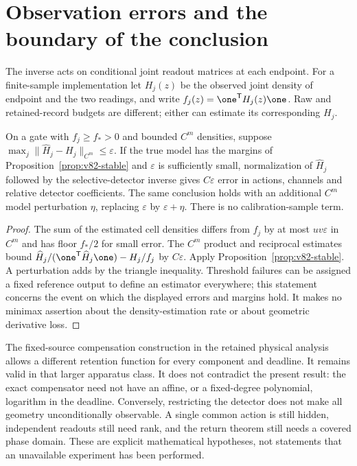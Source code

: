\section{Observation errors and the boundary of the conclusion}
\label{sec:v82-scope}

The inverse acts on conditional joint readout matrices at each endpoint.
For a finite-sample implementation let $H_j(z)$ be the observed joint
density of endpoint and the two readings, and write
$f_j(z)=\one^{\mathsf T}H_j(z)\one$. Raw and retained-record budgets
are different; either can estimate its corresponding $H_j$.

\begin{corollary}
\label{cor:v82-error}
On a gate with $f_j\ge f_*>0$ and bounded $C^m$ densities, suppose
$\max_j\|\widehat H_j-H_j\|_{C^m}\le\varepsilon$.
If the true model has the margins of Proposition~\ref{prop:v82-stable}
and $\varepsilon$ is sufficiently small, normalization of
$\widehat H_j$ followed by the selective-detector inverse gives
$C\varepsilon$ error in actions, channels and relative detector
coefficients. The same conclusion holds with an additional
$C^m$ model perturbation $\eta$, replacing $\varepsilon$ by
$\varepsilon+\eta$. There is no calibration-sample term.
\end{corollary}
\begin{proof}
The sum of the estimated cell densities differs from $f_j$ by at most
$uv\varepsilon$ in $C^m$ and has floor $f_*/2$ for small error.
The $C^m$ product and reciprocal estimates bound
$\widehat H_j/(\one^{\mathsf T}\widehat H_j\one)-H_j/f_j$
by $C\varepsilon$. Apply Proposition~\ref{prop:v82-stable}.
A perturbation adds by the triangle inequality. Threshold failures can
be assigned a fixed reference output to define an estimator everywhere;
this statement concerns the event on which the displayed errors and
margins hold. It makes no minimax assertion about the density-estimation
rate or about geometric derivative loss.
\end{proof}

The fixed-source compensation construction in the retained physical
analysis allows a different retention function for every component and
deadline. It remains valid in that larger apparatus class. It does not
contradict the present result: the exact compensator need not have an
affine, or a fixed-degree polynomial, logarithm in the deadline.
Conversely, restricting the detector does not make all geometry
unconditionally observable. A single common action is still hidden,
independent readouts still need rank, and the return theorem still needs
a covered phase domain. These are explicit mathematical hypotheses,
not statements that an unavailable experiment has been performed.

